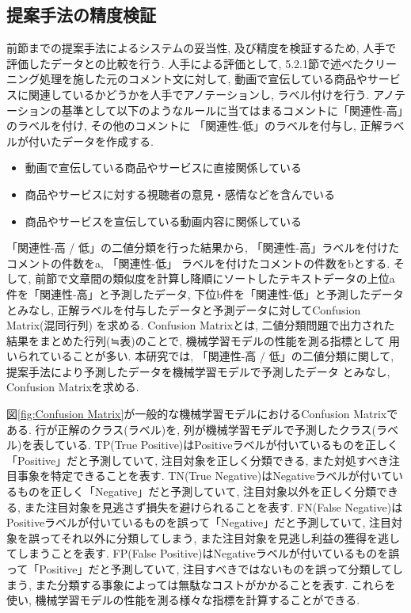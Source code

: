 \documentclass{ltjarticle}
\begin{document}
\subsection{提案手法の精度検証}
前節までの提案手法によるシステムの妥当性, 及び精度を検証するため, 人手で評価したデータとの比較を行う. 
人手による評価として, 5.2.1節で述べたクリーニング処理を施した元のコメント文に対して, 
動画で宣伝している商品やサービスに関連しているかどうかを人手でアノテーションし, ラベル付けを行う. 
アノテーションの基準として以下のようなルールに当てはまるコメントに「関連性-高」のラベルを付け, その他のコメントに
「関連性-低」のラベルを付与し, 正解ラベルが付いたデータを作成する. 
\vspace{10truept}

\begin{itemize}
    \item 動画で宣伝している商品やサービスに直接関係している
    \item 商品やサービスに対する視聴者の意見・感情などを含んでいる
    \item 商品やサービスを宣伝している動画内容に関係している
\end{itemize}
\vspace{10truept}


「関連性-高 / 低」の二値分類を行った結果から, 「関連性-高」ラベルを付けたコメントの件数をa, 「関連性-低」
ラベルを付けたコメントの件数をbとする. 
そして, 前節で文章間の類似度を計算し降順にソートしたテキストデータの上位a件を「関連性-高」と予測したデータ, 
下位b件を「関連性-低」と予測したデータとみなし, 正解ラベルを付与したデータと予測データに対してConfusion Matrix(混同行列)
を求める. Confusion Matrixとは, 二値分類問題で出力された結果をまとめた行列(≒表)のことで, 機械学習モデルの性能を測る指標として
用いられていることが多い. 本研究では, 「関連性-高 / 低」の二値分類に関して, 提案手法により予測したデータを機械学習モデルで予測したデータ
とみなし, Confusion Matrixを求める. 

図\ref{fig:Confusion Matrix}が一般的な機械学習モデルにおけるConfusion Matrixである. 行が正解のクラス(ラベル)を, 列が機械学習モデルで予測したクラス(ラベル)を表している. 
TP(True Positive)はPositiveラベルが付いているものを正しく「Positive」だと予測していて, 注目対象を正しく分類できる, また対処すべき注目事象を特定できることを表す. 
TN(True Negative)はNegativeラベルが付いているものを正しく「Negative」だと予測していて, 注目対象以外を正しく分類できる, また注目対象を見逃さず損失を避けられることを表す. 
FN(False Negative)はPositiveラベルが付いているものを誤って「Negative」だと予測していて, 注目対象を誤ってそれ以外に分類してしまう, また注目対象を見逃し利益の獲得を逃してしまうことを表す. 
FP(False Positive)はNegativeラベルが付いているものを誤って「Positive」だと予測していて, 注目すべきではないものを誤って分類してしまう, また分類する事象によっては無駄なコストがかかることを表す. 
これらを使い, 機械学習モデルの性能を測る様々な指標を計算することができる. 
\vspace{10truept}
\end{document}
